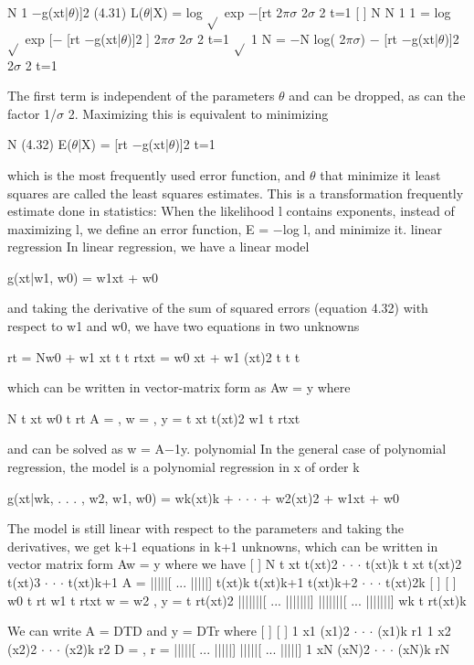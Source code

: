 N 1 $-$g(xt|$\theta$)]2 (4.31) L($\theta$|X) = log $\sqrt{}$ exp $-$[rt 2$\pi$$\sigma$ 2$\sigma$ 2 t=1 [ ] N N 1 1 = log $\sqrt{}$ exp [$-$ [rt $-$g(xt|$\theta$)]2 ] 2$\pi$$\sigma$ 2$\sigma$ 2 t=1 $\sqrt{}$ 1 N = $-$N log( 2$\pi$$\sigma$) $-$ [rt $-$g(xt|$\theta$)]2 2$\sigma$ 2 t=1

The first term is independent of the parameters $\theta$ and can be dropped, as can the factor 1/$\sigma$ 2. Maximizing this is equivalent to minimizing

N (4.32) E($\theta$|X) = [rt $-$g(xt|$\theta$)]2 t=1

which is the most frequently used error function, and $\theta$ that minimize it least squares are called the least squares estimates. This is a transformation frequently estimate done in statistics: When the likelihood l contains exponents, instead of maximizing l, we define an error function, E = $-$log l, and minimize it. linear regression In linear regression, we have a linear model

g(xt|w1, w0) = w1xt + w0

and taking the derivative of the sum of squared errors (equation 4.32) with respect to w1 and w0, we have two equations in two unknowns

rt = Nw0 + w1 xt t t rtxt = w0 xt + w1 (xt)2 t t t

which can be written in vector-matrix form as Aw = y where

N t xt w0 t rt A = , w = , y = t xt t(xt)2 w1 t rtxt

and can be solved as w = A$-$1y. polynomial In the general case of polynomial regression, the model is a polynomial regression in x of order k

g(xt|wk, . . . , w2, w1, w0) = wk(xt)k + $\cdot$ $\cdot$ $\cdot$ + w2(xt)2 + w1xt + w0

The model is still linear with respect to the parameters and taking the derivatives, we get k+1 equations in k+1 unknowns, which can be written in vector matrix form Aw = y where we have [ ] N t xt t(xt)2 $\cdot$ $\cdot$ $\cdot$ t(xt)k t xt t(xt)2 t(xt)3 $\cdot$ $\cdot$ $\cdot$ t(xt)k+1 A = |||||[ ... |||||] t(xt)k t(xt)k+1 t(xt)k+2 $\cdot$ $\cdot$ $\cdot$ t(xt)2k [ ] [ ] w0 t rt w1 t rtxt w = w2 , y = t rt(xt)2 |||||||[ ... |||||||] |||||||[ ... |||||||] wk t rt(xt)k

We can write A = DTD and y = DTr where [ ] [ ] 1 x1 (x1)2 $\cdot$ $\cdot$ $\cdot$ (x1)k r1 1 x2 (x2)2 $\cdot$ $\cdot$ $\cdot$ (x2)k r2 D = , r = |||||[ ... |||||] |||||[ ... |||||] 1 xN (xN)2 $\cdot$ $\cdot$ $\cdot$ (xN)k rN

